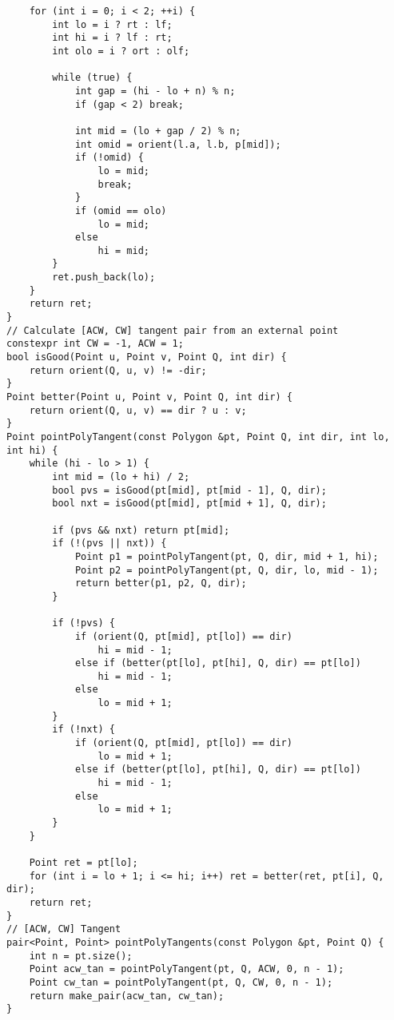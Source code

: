 \documentclass[FSZ,a4paper,onesided]{article}
\begin{document}
\begin{multicols*}{\COLS}
\begin{lstlisting}
    for (int i = 0; i < 2; ++i) {
        int lo = i ? rt : lf;
        int hi = i ? lf : rt;
        int olo = i ? ort : olf;

        while (true) {
            int gap = (hi - lo + n) % n;
            if (gap < 2) break;

            int mid = (lo + gap / 2) % n;
            int omid = orient(l.a, l.b, p[mid]);
            if (!omid) {
                lo = mid;
                break;
            }
            if (omid == olo)
                lo = mid;
            else
                hi = mid;
        }
        ret.push_back(lo);
    }
    return ret;
}
// Calculate [ACW, CW] tangent pair from an external point
constexpr int CW = -1, ACW = 1;
bool isGood(Point u, Point v, Point Q, int dir) {
    return orient(Q, u, v) != -dir;
}
Point better(Point u, Point v, Point Q, int dir) {
    return orient(Q, u, v) == dir ? u : v;
}
Point pointPolyTangent(const Polygon &pt, Point Q, int dir, int lo, int hi) {
    while (hi - lo > 1) {
        int mid = (lo + hi) / 2;
        bool pvs = isGood(pt[mid], pt[mid - 1], Q, dir);
        bool nxt = isGood(pt[mid], pt[mid + 1], Q, dir);

        if (pvs && nxt) return pt[mid];
        if (!(pvs || nxt)) {
            Point p1 = pointPolyTangent(pt, Q, dir, mid + 1, hi);
            Point p2 = pointPolyTangent(pt, Q, dir, lo, mid - 1);
            return better(p1, p2, Q, dir);
        }

        if (!pvs) {
            if (orient(Q, pt[mid], pt[lo]) == dir)
                hi = mid - 1;
            else if (better(pt[lo], pt[hi], Q, dir) == pt[lo])
                hi = mid - 1;
            else
                lo = mid + 1;
        }
        if (!nxt) {
            if (orient(Q, pt[mid], pt[lo]) == dir)
                lo = mid + 1;
            else if (better(pt[lo], pt[hi], Q, dir) == pt[lo])
                hi = mid - 1;
            else
                lo = mid + 1;
        }
    }

    Point ret = pt[lo];
    for (int i = lo + 1; i <= hi; i++) ret = better(ret, pt[i], Q, dir);
    return ret;
}
// [ACW, CW] Tangent
pair<Point, Point> pointPolyTangents(const Polygon &pt, Point Q) {
    int n = pt.size();
    Point acw_tan = pointPolyTangent(pt, Q, ACW, 0, n - 1);
    Point cw_tan = pointPolyTangent(pt, Q, CW, 0, n - 1);
    return make_pair(acw_tan, cw_tan);
}
\end{lstlisting}

\end{multicols*}
\end{document}

